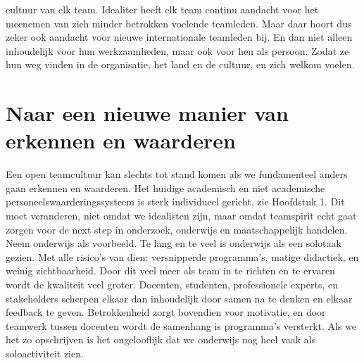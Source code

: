 \documentclass[smallauthor, chapterhaspagenum, nochapterinheader, pagenuminheader,  bigchapnum,medium2, tocpages,  garamond, titleinheader]{jote-book}
\begin{document}
cultuur van elk team. Idealiter heeft elk team continu aandacht voor het meenemen van zich minder betrokken voelende teamleden. Maar daar hoort dus zeker ook aandacht voor nieuwe internationale teamleden bij. En dan niet alleen inhoudelijk voor hun werkzaamheden, maar ook voor hen als persoon. Zodat ze hun weg vinden in de organisatie, het land en de cultuur, en zich welkom voelen.



	\section{Naar een nieuwe manier van erkennen en waarderen}



	Een open teamcultuur kan slechts tot stand komen als we fundamenteel anders gaan erkennen en waarderen. Het huidige academisch en niet academische personeelswaarderingssysteem is sterk individueel gericht, zie Hoofdstuk 1. Dit moet veranderen, niet omdat we idealisten zijn, maar omdat teamspirit echt gaat zorgen voor de next step in onderzoek, onderwijs en maatschappelijk handelen. Neem onderwijs als voorbeeld. Te lang en te veel is onderwijs als een solotaak gezien. Met alle risico's van dien: versnipperde programma's, matige didactiek, en weinig zichtbaarheid. Door dit veel meer als team in te richten en te ervaren wordt de kwaliteit veel groter. Docenten, studenten, professionele experts, en stakeholders scherpen elkaar dan inhoudelijk door samen na te denken en elkaar feedback te geven. Betrokkenheid zorgt bovendien voor motivatie, en door teamwerk tussen docenten wordt de samenhang is programma's versterkt. Als we het zo opschrijven is het ongelooflijk dat we onderwijs nog heel vaak als soloactiviteit zien.
\end{document}
